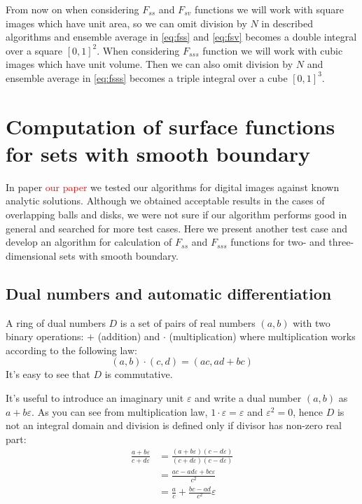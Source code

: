 \documentclass[reprint,amsmath,amssymb,aps,pre,showkeys,showpacs]{revtex4-1}
\begin{document}
From now on when considering $F_{ss}$ and $F_{sv}$ functions we will work with
square images which have unit area, so we can omit division by $N$ in described
algorithms and ensemble average in \cref{eq:fss} and \cref{eq:fsv} becomes a
double integral over a square $[0, 1]^2$. When considering $F_{sss}$ function we
will work with cubic images which have unit volume. Then we can also omit
division by $N$ and ensemble average in \cref{eq:fsss} becomes a triple integral
over a cube $[0, 1]^3$.

\section{Computation of surface functions for sets with smooth boundary}
\label{sec:algo-precise}
In paper \textcolor{red}{our paper} we tested our algorithms for digital images
against known analytic solutions. Although we obtained acceptable results in the cases of
overlapping balls and disks, we were not sure if our algorithm performs good in
general and searched for more test cases. Here we present another test case and
develop an algorithm for calculation of $F_{ss}$ and $F_{sss}$ functions for
two- and three-dimensional sets with smooth boundary.

\subsection{Dual numbers and automatic differentiation}
\label{sec:dual}
A ring of dual numbers $D$ is a set of pairs of real numbers $(a, b)$ with two
binary operations: $+$ (addition) and $\cdot$ (multiplication) where
multiplication works according to the following law:
\begin{equation*}
  (a, b)\cdot(c, d) = (ac, ad + bc)
\end{equation*}
It's easy to see that $D$ is commutative.

It's useful to introduce an imaginary unit $\varepsilon$ and write a dual number
$(a, b)$ as $a + b\varepsilon$. As you can see from multiplication law,
$1\cdot \varepsilon = \varepsilon$ and $\varepsilon^2 = 0$, hence $D$ is not an
integral domain and division is defined only if divisor has non-zero real part:
\begin{align*}
  \frac{a+b\varepsilon}{c+d\varepsilon} &=
  \frac{(a+b\varepsilon)(c-d\varepsilon)}{(c+d\varepsilon)(c-d\varepsilon)} \\
  &= \frac{ac-ad\varepsilon+bc\varepsilon}{c^2} \\
  &= \frac{a}{c} + \frac{bc-ad}{c^2}\varepsilon
\end{align*}
\end{document}
